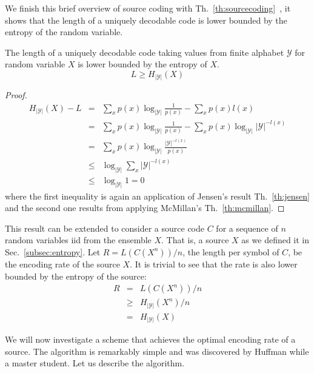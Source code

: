 We finish this brief overview of source coding with Th.~\ref{th:sourcecoding}~\cite{Cover_91}, it shows that the length  of a uniquely decodable code is lower bounded by the entropy of the random variable.
\begin{theorem}
\label{th:sourcecoding}
The length of a uniquely decodable code taking values from finite alphabet $\mathcal{Y}$ for random variable ${X}$ is lower bounded by the entropy of ${X}$.
\begin{equation*}
L\geq H_{|\mathcal{Y}|}({X})
\end{equation*}
\end{theorem}
\begin{proof}
\begin{eqnarray}
H_{|\mathcal{Y}|}({X}) - L &=& \sum_{x} p(x) \log_{|\mathcal{Y}|} \frac{1}{p(x)} - \sum_{x}p(x)l(x) \nonumber \\
                                      &=& \sum_{x} p(x) \log_{|\mathcal{Y}|} \frac{1}{p(x)} - \sum_{x} p(x)  \log_{|\mathcal{Y}|} |\mathcal{Y}|^{-l(x)} \nonumber \\
                                      &=& \sum_{x} p(x) \log_{|\mathcal{Y}|} \frac{|\mathcal{Y}|^{-l(x)} }{p(x)} \nonumber \\
                                      &\leq & \log_{|\mathcal{Y}|} \sum_{x} |\mathcal{Y}|^{-l(x)} \nonumber \\
                                      &\leq & \log_{|\mathcal{Y}|} 1 = 0
\end{eqnarray}
\noindent where the first inequality is again an application of Jensen's result Th.~\ref{th:jensen} and the second one results from applying McMillan's Th.~\ref{th:mcmillan}.
\end{proof}
This result can be extended to consider a source code $C$ for a sequence of $n$ random variables {iid} from the ensemble ${X}$. That is, a source  ${X}$ as we defined it in Sec.~\ref{subsec:entropy}. Let $R=L(C({X^n}))/n$, the length per symbol of $C$, be the encoding rate of the source ${X}$. It is trivial to see that the rate is also lower bounded by the entropy of the source: \begin{eqnarray} R &=& L(C({X^n}))/n \nonumber\\
  &\geq& H_{|\mathcal{Y}|}({X^n})/n \nonumber\\
 &=& H_{|\mathcal{Y}|}({X})
\end{eqnarray}

We will now investigate a scheme that achieves the optimal encoding rate of a source. The algorithm is remarkably simple and was discovered by Huffman \cite{} while a master student. Let us describe the algorithm.

